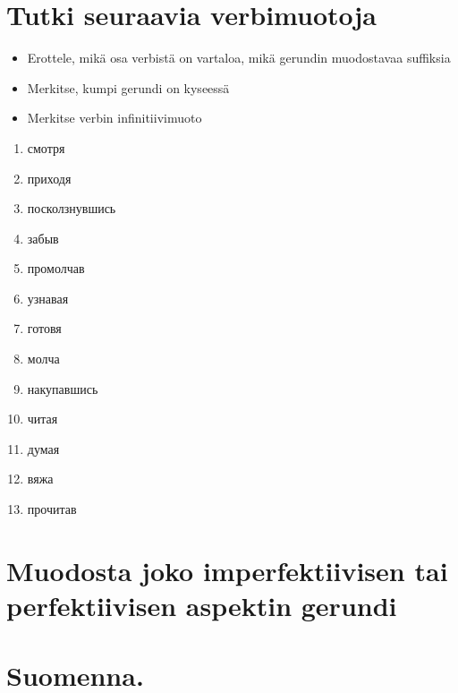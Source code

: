 
\section{Tutki seuraavia verbimuotoja}

\begin{itemize}
    \item Erottele, mikä osa verbistä on vartaloa, mikä gerundin muodostavaa suffiksia
    \item Merkitse, kumpi gerundi on kyseessä
    \item Merkitse verbin infinitiivimuoto
\end{itemize}

\begin{enumerate}
    \item смотря
    \item приходя
    \item посколзнувшись
    \item забыв
    \item промолчав
    \item узнавая
    \item готовя
    \item молча
    \item накупавшись
    \item читая
    \item думая
    \item вяжа
    \item прочитав
\end{enumerate}

\section{Muodosta joko imperfektiivisen tai perfektiivisen aspektin gerundi}

\section{Suomenna.}

